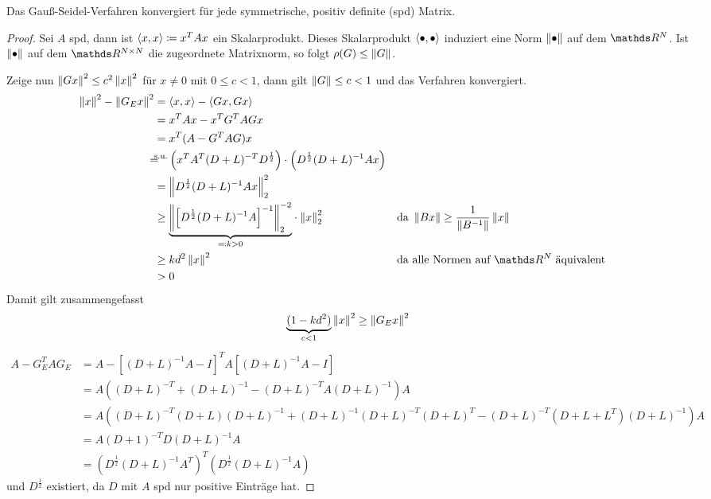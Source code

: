 \begin{Satze}
  Das Gauß-Seidel-Verfahren konvergiert für jede symmetrische, positiv
  definite (spd) Matrix.

  \begin{proof}
    Sei $A$ spd, dann ist $\langle x, x \rangle\coloneqq x^T Ax$ ein Skalarprodukt.
    Dieses Skalarprodukt $\langle \bullet, \bullet \rangle$ induziert eine
    Norm $\left\| \bullet \right\|$ auf dem $\R^N$.
    Ist $\left\| \bullet \right\|$ auf dem $\R^{N\times N}$ die zugeordnete
    Matrixnorm, so folgt $\rho(G) \leq \left\| G \right\|$.

    Zeige nun $\left\| Gx \right\|^2\leq c^2\left\| x \right\|^2$ für $x\neq 0$ mit $0\leq c<1$,
    dann gilt $\left\| G \right\|\leq c<1$ und das Verfahren konvergiert.
    \begin{align*}
      \nn{x}^2-\nn{G_Ex}^2 &= \scp{x}{x}-\scp{Gx}{Gx} \\
                           &= x^TAx-x^TG^TAGx \\
                           &=x^T(A-G^TAG)x\\
                           &\mathclap{=}^\text{s.u.} \left(
                             x^TA^T(D+L)^{-T}D^{\frac{1}{2}}
                             \right)
                             \cdot \left(
                             D^{\frac{1}{2}}(D+L)^{-1}Ax
                             \right)\\
                           &=\nn{D^{\frac{1}{2}}(D+L)^{-1}Ax}_2^2\\
                           &\geq {\underbrace{\nn{\left[
                             D^{\frac{1}{2}}(D+L)^{-1}A
                             \right]^{-1}}_2^{-2}}_{\eqqcolon
                             k>0}}\cdot\nn{x}_2^{2}
                           && \text{da } \nn{Bx}\geq \frac{1}{\nn{B^{-1}}}\nn{x}\\
                           &\geq kd^2\nn{x}^2
                           &&\text{da alle Normen auf $\R^N$ äquivalent}\\
                           &>0
    \end{align*}
Damit gilt zusammengefasst
\begin{gather*}
  \underbrace{(1-kd^2)}_{c<1}\left\| x \right\|^2\geq \left\| G_Ex \right\|^2
\end{gather*}
\begin{align*}
  A-G_E^TAG_E &=A-\left[(D+L)^{-1}A-I\right]^TA\left[(D+L)^{-1}A-I\right]\\
              &=A\left((D+L)^{-T}+(D+L)^{-1}-(D+L)^{-T}A(D+L)^{-1}\right)A\\
              &=A\left((D+L)^{-T}(D+L)(D+L)^{-1}
                +(D+L)^{-1}(D+L)^{-T}(D+L)^T
                -(D+L)^{-T}(D+L+L^T)(D+L)^{-1}\right)A\\
              &=A(D+1)^{-T}D(D+L)^{-1}A\\
              &=\left(D^\frac{1}{2}(D+L)^{-1}A^T\right)^T
                \left(D^\frac{1}{2}(D+L)^{-1}A\right)
\end{align*}
und $D^{\frac{1}{2}}$ existiert, da $D$ mit $A$ spd 
nur positive Einträge hat.
  \end{proof}
\end{Satze}


